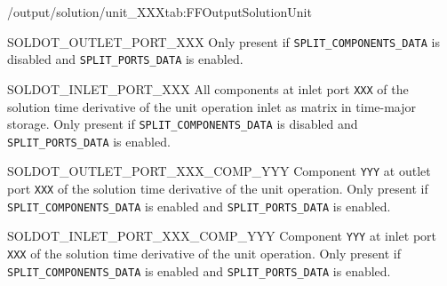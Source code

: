 \begin{groupscope}{/output/solution/unit\_XXX}{tab:FFOutputSolutionUnit}
\begin{dataset}[type=double,unit={\si{\mol\per\cubic\metre\of{IV}\per\second}}]{SOLDOT\_OUTLET\_PORT\_XXX}
    Only present if \texttt{SPLIT\_COMPONENTS\_DATA} is disabled and \texttt{SPLIT\_PORTS\_DATA} is enabled.
  \end{dataset}
  \begin{dataset}[type=double,unit={\si{\mol\per\cubic\metre\of{IV}\per\second}}]{SOLDOT\_INLET\_PORT\_XXX}
    All components at inlet port \texttt{XXX} of the solution time derivative of the unit operation inlet as matrix in time-major storage.
    Only present if \texttt{SPLIT\_COMPONENTS\_DATA} is disabled and \texttt{SPLIT\_PORTS\_DATA} is enabled.
  \end{dataset}
  \begin{dataset}[type=double,unit={\si{\mol\per\cubic\metre\of{IV}\per\second}}]{SOLDOT\_OUTLET\_PORT\_XXX\_COMP\_YYY}
    Component \texttt{YYY} at outlet port \texttt{XXX} of the solution time derivative of the unit operation.
    Only present if \texttt{SPLIT\_COMPONENTS\_DATA} is enabled and \texttt{SPLIT\_PORTS\_DATA} is enabled.
  \end{dataset}
  \begin{dataset}[type=double,unit={\si{\mol\per\cubic\metre\of{IV}\per\second}}]{SOLDOT\_INLET\_PORT\_XXX\_COMP\_YYY}
    Component \texttt{YYY} at inlet port \texttt{XXX} of the solution time derivative of the unit operation.
    Only present if \texttt{SPLIT\_COMPONENTS\_DATA} is enabled and \texttt{SPLIT\_PORTS\_DATA} is enabled.
  \end{dataset}
\end{groupscope}

